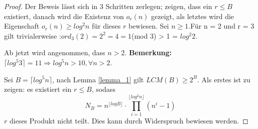 \documentclass[12pt,oneside]{article}
\theoremstyle{remark}
\theoremstyle{definition}
\begin{document}
\begin{proof}
Der Beweis lässt sich in 3 Schritten zerlegen; zeigen, dass ein $r \leq B$ existiert, danach wird die Existenz von $o_{r}(n)$ gezeigt, als letztes wird die Eigenschaft $o_{r}(n) \geq log^2 n$ für dieses $r$ bewiesen. 
Sei $n \geq 1$.\newline\newline Für n = 2 und r = 3 gilt trivialerweise :\newline\newline $ord_{3}(2) = 2^2 = 4 = 1 $(mod 3) > 1 = $log^2 2$.

Ab jetzt wird angenommen, dass $n > 2$.\newline\newline
\textbf{Bemerkung: } $\lceil log^5 3 \rceil = 11 \Rightarrow log^5 n > 10, \forall n > 2$.

Sei $B = \lceil log^5 n \rceil$, nach Lemma \ref{lemma_1} gilt $LCM(B) \geq 2^B$. Als erstes ist zu zeigen: es existiert ein $r \leq B$, sodass
\begin{equation}\label{prod_cor}
     N_{B} = n^{\lfloor log B \rfloor } \cdot \prod_{i = 1}^{\lfloor log^2 n \rfloor} (n^i - 1)
\end{equation}
$r$ dieses Produkt nicht teilt. Dies kann durch Widerspruch bewiesen werden.


\end{proof}
\end{document}
